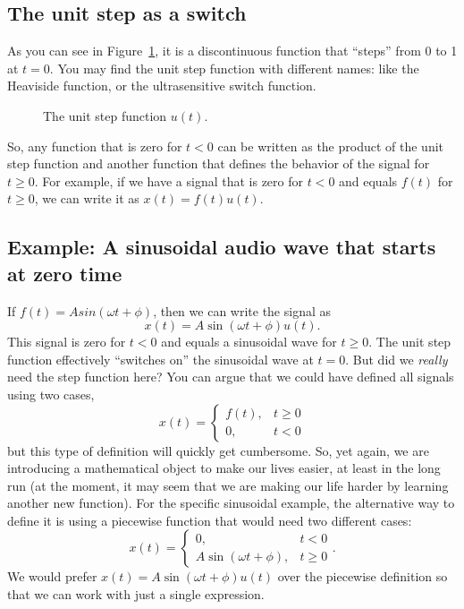 \documentclass{ee102_notes}
\begin{document}
\subsection{The unit step as a switch}
As you can see in Figure~\ref{fig:unit_step}, it is a discontinuous function that ``steps'' from 0 to 1 at $t = 0$. You may find the unit step function with different names: like the Heaviside function, or the ultrasensitive switch function. 
\begin{figure}[h!]
    \centering
    \caption{The unit step function $u(t)$.}
    \label{fig:unit_step}
\end{figure}

So, any function that is zero for $t < 0$ can be written as the product of the unit step function and another function that defines the behavior of the signal for $t \geq 0$. For example, if we have a signal that is zero for $t < 0$ and equals $f(t)$ for $t \geq 0$, we can write it as $x(t) = f(t)u(t)$.
\subsection{Example: A sinusoidal audio wave that starts at zero time}
If $f(t) = A sin(\omega t + \phi)$, then we can write the signal as 
\[
x(t) = A \sin(\omega t + \phi) u(t).
\]
This signal is zero for $t < 0$ and equals a sinusoidal wave for $t \geq 0$. The unit step function effectively ``switches on'' the sinusoidal wave at $t = 0$. 
But did we \emph{really} need the step function here? You can argue that we could have defined all signals using two cases, 
\[
x(t) = \begin{cases}
f(t), & t \geq 0 \\
0, & t < 0
\end{cases}
\]
but this type of definition will quickly get cumbersome. So, yet again, we are introducing a mathematical object to make our lives easier, at least in the long run (at the moment, it may seem that we are making our life harder by learning another new function).
For the specific sinusoidal example, the alternative way to define it is using a piecewise function that would need two different cases:
\[
x(t) = \begin{cases}
0, & t < 0 \\
A \sin(\omega t + \phi), & t \geq 0
\end{cases}.
\]
We would prefer $x(t) = A \sin(\omega t + \phi) u(t)$ over the piecewise definition so that we can work with just a single expression. 
\end{document}
